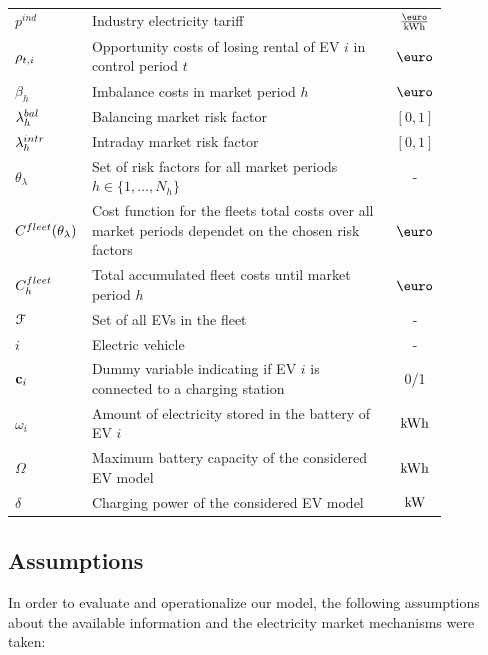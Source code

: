 \documentclass[a4paper, 12pt]{article}
\begin{document}
\begin{longtable}{p{0.11\linewidth}|p{0.75\linewidth}|c}
\(p^{ind}\) & Industry electricity tariff & \(\ekwh\)\\
\(\rho_{t,i}\) & Opportunity costs of losing rental of EV \(i\) in control period \(t\) & \(\eur\)\\
\(\beta_h\) & Imbalance costs in market period \(h\) & \(\eur\)\\
\hline
\(\lambda^{bal}_{h}\) & Balancing market risk factor & \([0,1]\)\\
\(\lambda^{intr}_{h}\) & Intraday market risk factor & \([0,1]\)\\
\(\theta_{\lambda}\) & Set of risk factors for all market periods \(h\!\in\!\{1,\hdots,N_h\}\) & -\\
\(C^{fleet}_{}(\theta_{\lambda})\) & Cost function for the fleets total costs over all market periods dependet on the chosen risk factors & \(\eur\)\\
\(C^{fleet}_{h}\) & Total accumulated fleet costs until market period \(h\) & \(\eur\)\\
\hline
\({\cal{F}}\) & Set of all EVs in the fleet & -\\
\(i\) & Electric vehicle & -\\
\({\bf{c}}_{i}\) & Dummy variable indicating if EV \(i\) is connected to a charging station & 0/1\\
\(\omega_{i}\) & Amount of electricity stored in the battery of EV \(i\) & \(\text{kWh}\)\\
\(\Omega\) & Maximum battery capacity of the considered EV model & \(\text{kWh}\)\\
\(\delta\) & Charging power of the considered EV model & \(\text{kW}\)\\
\hline
\end{longtable}

\subsection{Assumptions \label{sec-model-assumptions}}
\label{sec:orgce809c3}

In order to evaluate and operationalize our model, the following assumptions
about the available information and the electricity market mechanisms were
taken:
\end{document}
